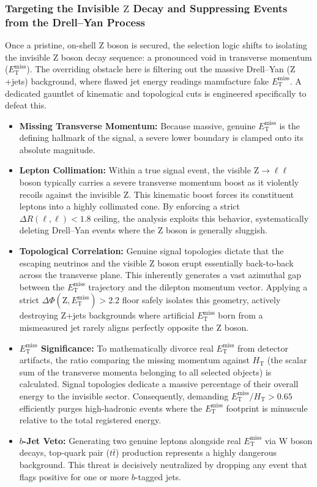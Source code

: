 \subsubsection{Targeting the Invisible $\text{Z}$ Decay and Suppressing Events from the Drell--Yan Process}
Once a pristine, on-shell $\text{Z}$ boson is secured, the selection logic shifts to isolating the invisible $\text{Z}$ boson decay sequence: a pronounced void in transverse momentum ($E_{\text{T}}^{\text{miss}}$). The overriding obstacle here is filtering out the massive Drell--Yan ($\text{Z}$+jets) background, where flawed jet energy readings manufacture fake $E_{\text{T}}^{\text{miss}}$. A dedicated gauntlet of kinematic and topological cuts is engineered specifically to defeat this.
\begin{itemize}
    \item \textbf{Missing Transverse Momentum:} Because massive, genuine $E_{\text{T}}^{\text{miss}}$ is the defining hallmark of the signal, a severe lower boundary is clamped onto its absolute magnitude.
    \item \textbf{Lepton Collimation:} Within a true signal event, the visible $\text{Z} \to \ell\ell$ boson typically carries a severe transverse momentum boost as it violently recoils against the invisible $\text{Z}$. This kinematic boost forces its constituent leptons into a highly collimated cone. By enforcing a strict $\Delta R(\ell,\ell) < 1.8$ ceiling, the analysis exploits this behavior, systematically deleting Drell--Yan events where the $\text{Z}$ boson is generally sluggish.
    \item \textbf{Topological Correlation:} Genuine signal topologies dictate that the escaping neutrinos and the visible $\text{Z}$ boson erupt essentially back-to-back across the transverse plane. This inherently generates a vast azimuthal gap between the $E_{\text{T}}^{\text{miss}}$ trajectory and the dilepton momentum vector. Applying a strict $\Delta\Phi(\text{Z}, E_{\text{T}}^{\text{miss}}) > 2.2$ floor safely isolates this geometry, actively destroying $\text{Z}$+jets backgrounds where artificial $E_{\text{T}}^{\text{miss}}$ born from a mismeasured jet rarely aligns perfectly opposite the $\text{Z}$ boson.
    \item \textbf{$E_{\text{T}}^{\text{miss}}$ Significance:} To mathematically divorce real $E_{\text{T}}^{\text{miss}}$ from detector artifacts, the ratio comparing the missing momentum against $H_{\text{T}}$ (the scalar sum of the transverse momenta belonging to all selected objects) is calculated. Signal topologies dedicate a massive percentage of their overall energy to the invisible sector. Consequently, demanding $E_{\text{T}}^{\text{miss}} / H_{\text{T}} > 0.65$ efficiently purges high-hadronic events where the $E_{\text{T}}^{\text{miss}}$ footprint is minuscule relative to the total registered energy.
    \item \textbf{$b$-Jet Veto:} Generating two genuine leptons alongside real $E_{\text{T}}^{\text{miss}}$ via $\text{W}$ boson decays, top-quark pair ($t\bar{t}$) production represents a highly dangerous background. This threat is decisively neutralized by dropping any event that flags positive for one or more $b$-tagged jets.
\end{itemize}


